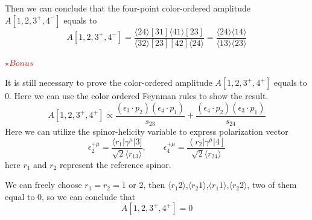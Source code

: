 \documentclass[12pt]{article}
\newcommand{\avg}[1]{\langle #1 \rangle}
\begin{document}
Then we can conclude that the four-point color-ordered amplitude $A[1,2,3^+,4^-]$ equals to
\begin{equation*}
    A[1,2,3^+,4^-]=\frac{\avg{24}[31]\avg{41}[23]}{\avg{32}[23][42]\avg{24}}=\frac{\avg{24}\avg{14}}{\avg{13}\avg{23}}
\end{equation*}

\textcolor{red}{$\star Bonus$}

It is still necessary to prove the color-ordered amplitude $A[1,2,3^+,4^+]$ equals to 0. Here we can use the color ordered Feynman rules to show the result.
\begin{equation*}
    A[1,2,3^+,4^+]\propto \frac{\left(\epsilon_3\cdot p_2\right)\left(\epsilon_4\cdot p_1\right)}{s_{23}}+\frac{\left(\epsilon_4\cdot p_2\right)\left(\epsilon_3\cdot p_1\right)}{s_{24}} 
\end{equation*}
Here we can utilize the spinor-helicity variable to express polarization vector
\begin{equation*}
    \epsilon_2^{+\mu}=\frac{\langle r_1 | \gamma^\mu | 3 ]}{\sqrt{2}\avg{r_13}},\qquad \epsilon_4^{+\mu}=\frac{\left <r_2|\gamma^\mu|4\right ]}{\sqrt{2}\avg{r_24}}
\end{equation*}
here $r_1$ and $r_2$ represent the reference spinor.

We can freely choose $r_1=r_2=1$ or 2, then $\avg{r_1 2}$,$\avg{r_2 1}$,$\avg{r_1 1}$,$\avg{r_2 2}$, two of them equal to 0, so we can conclude that
\begin{equation*}
    A[1,2,3^+,4^+]=0
\end{equation*}
\end{document}

